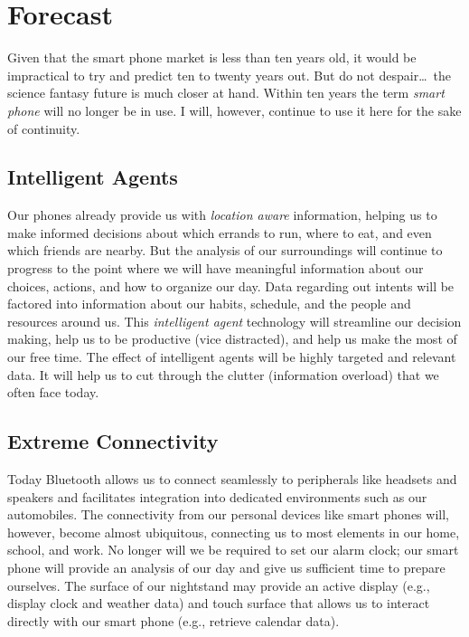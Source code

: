 \documentclass[letterpaper,12pt]{article}
\begin{document}
\section*{Forecast}
Given that the smart phone market is less than ten years old, it would be impractical to try and predict ten to twenty years out.  But do not despair\dots\ the science fantasy future is much closer at hand.  Within ten years the term \emph{smart phone} will no longer be in use.  I will, however, continue to use it here for the sake of continuity.

\subsection*{Intelligent Agents}
Our phones already provide us with \emph{location aware} information, helping us to make informed decisions about which errands to run, where to eat, and even which friends are nearby.  But the analysis of our surroundings will continue to progress to the point where we will have meaningful information about our choices, actions, and how to organize our day.  Data regarding out intents will be factored into information about our habits, schedule, and the people and resources around us.  This \emph{intelligent agent} technology will streamline our decision making, help us to be productive (vice distracted), and help us make the most of our free time.  The effect of intelligent agents will be highly targeted and relevant data.  It will help us to cut through the clutter (information overload) that we often face today.

\subsection*{Extreme Connectivity}
Today Bluetooth allows us to connect seamlessly to peripherals like headsets and speakers and facilitates integration into dedicated environments such as our automobiles.  The connectivity from our personal devices like smart phones will, however, become almost ubiquitous, connecting us to most elements in our home, school, and work.  No longer will we be required to set our alarm clock; our smart phone will provide an analysis of our day and give us sufficient time to prepare ourselves.  The surface of our nightstand may provide an active display (e.g., display clock and weather data) and touch surface that allows us to interact directly with our smart phone (e.g., retrieve calendar data).
\end{document}
